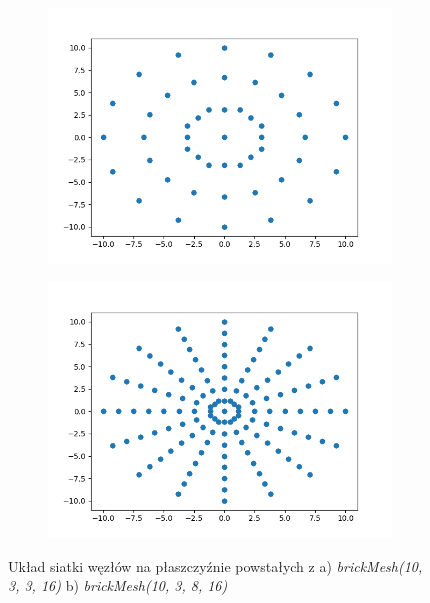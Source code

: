 \begin{figure}
\begin{subfigure}{.5\textwidth}
  \centering
  \includegraphics[width=1.0\linewidth]{Zdjecia/5/hex_siatka1}
  \caption{}
  \label{fig:sfig1}
\end{subfigure}
\begin{subfigure}{.5\textwidth}
  \centering
  \includegraphics[width=1.0\linewidth]{Zdjecia/5/hex_siatka2}
  \caption{}
  \label{fig:sfig2}
\end{subfigure}
\caption{Układ siatki węzłów na płaszczyźnie powstałych z a) \textit{brickMesh(10, 3, 3, 16)} b) \textit{brickMesh(10, 3, 8, 16)} }
\label{fig:hex_siatka}
\end{figure}

